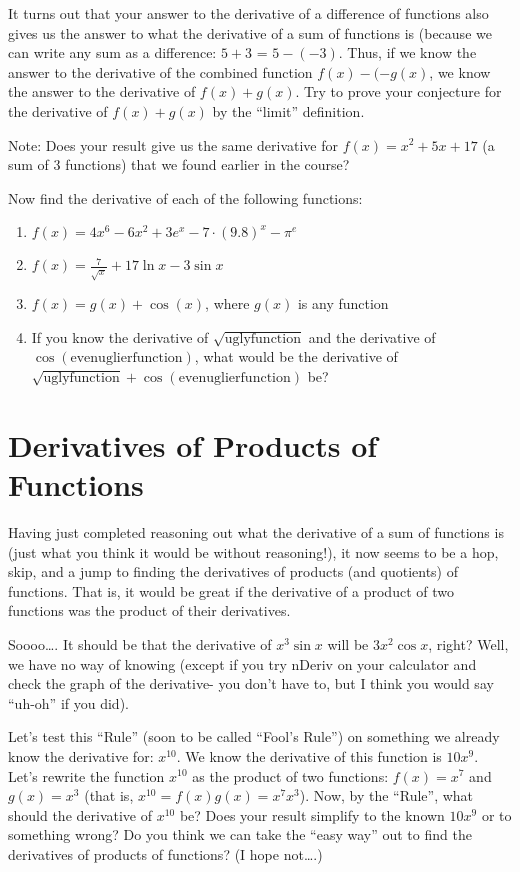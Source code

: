 \documentclass{ximera}
\begin{document}
It turns out that your answer to the derivative of a difference of functions also gives us the answer to what the derivative of a sum of functions is (because we can write any sum as a difference:  $5+3$ = $5-(-3)$.  Thus, if we know the answer to the derivative of the combined function $f(x) - (-g(x)$, we know the answer to the derivative of  $f(x) + g(x)$.  Try to prove your conjecture for the derivative of $f(x) + g(x)$ by the ``limit'' definition.

Note:  Does your result give us the same derivative for $f(x) = x^2+5x+17$ (a sum of 3 functions) that we found earlier in the course?

\begin{question}
Now find the derivative of each of the following functions:
\begin{enumerate}
    \item $f(x) = 4x^6-6x^2+3e^x-7\cdot (9.8)^x - \pi^e$
    \item $f(x) = \frac{7}{\sqrt{x}} + 17\ln x - 3\sin x$
    \item $f(x) = g(x) + \cos(x)$, where $g(x)$ is any function
    \item If you know the derivative of $\sqrt{\text{uglyfunction}}$ and the derivative of $\cos(\text{evenuglierfunction})$, what would be the derivative of $\sqrt{\text{uglyfunction}} + \cos(\text{evenuglierfunction})$ be?
\end{enumerate}
\end{question}

\section*{Derivatives of Products of Functions}

Having just completed reasoning out what the derivative of a sum of functions is (just what you think it would be without reasoning!), it now seems to be a hop, skip, and a jump to finding the derivatives of products (and quotients) of functions.  That is, it would be great if the derivative of a product of two functions was the product of their derivatives.

    Soooo\dots. It should be that the derivative of $x^3\sin x$ will be  $3x^2\cos x$, right?  Well, we have no way of knowing (except if you try nDeriv on your calculator and check the graph of the derivative- you don't have to, but I think you would say ``uh-oh'' if you did).
    
    Let's test this ``Rule'' (soon to be called ``Fool's Rule'') on something we already know the derivative for:  $x^{10}$.  We know the derivative of this function is  $10x^9$.  Let's rewrite the function $x^{10}$ as the product of two functions: $f(x) = x^7$  and $g(x) = x^3$ (that is,  $x^{10} = f(x) g(x) = x^7x^3$).  Now, by the ``Rule'', what should the derivative of $x^{10}$  be?  Does your result simplify to the known $10x^9$ or to something wrong?  Do you think we can take the ``easy way'' out to find the derivatives of products of functions?  (I hope not\dots.)
    
\end{document}
